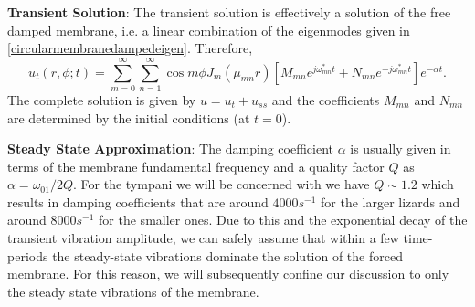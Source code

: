 \vspace{\baselineskip}
\noindent\textbf{Transient Solution}: The transient solution is effectively a solution of the free damped membrane, i.e. a linear 
combination of the eigenmodes given in \eqref{circularmembranedampedeigen}. Therefore,
\begin{equation}\label{membranet1}
 u_t(r,\phi;t)=\displaystyle\sum^\infty_{m=0}\sum^\infty_{n=1}\cos m\phi J_m(\mu_{mn} r)\left[M_{mn}e^{j\omega_{mn}^* t}+N_{mn}e^{-j\omega_{mn}^* t}\right]e^{-\alpha t}.
\end{equation}
The complete solution is given by $u=u_t+u_{ss}$ and the coefficients $M_{mn}$ and $N_{mn}$ are determined by the initial conditions (at $t=0$).

\vspace{\baselineskip}
\textbf{Steady State Approximation}: The damping coefficient $\alpha$ is usually given in terms of the membrane fundamental frequency and a quality factor $Q$ as $\alpha=\omega_{01}/2Q$. For the tympani
we will be concerned with we have $Q\sim 1.2$ which results in damping coefficients that are around $4000s^{-1} $ for the larger lizards and around $8000s^{-1}$ for the smaller ones. 
Due to this and the exponential decay of the transient vibration amplitude, we can safely assume that within a few time-periods the steady-state vibrations dominate the solution of the
forced membrane. For this reason, we will subsequently confine our discussion to only the steady state vibrations of the membrane.
